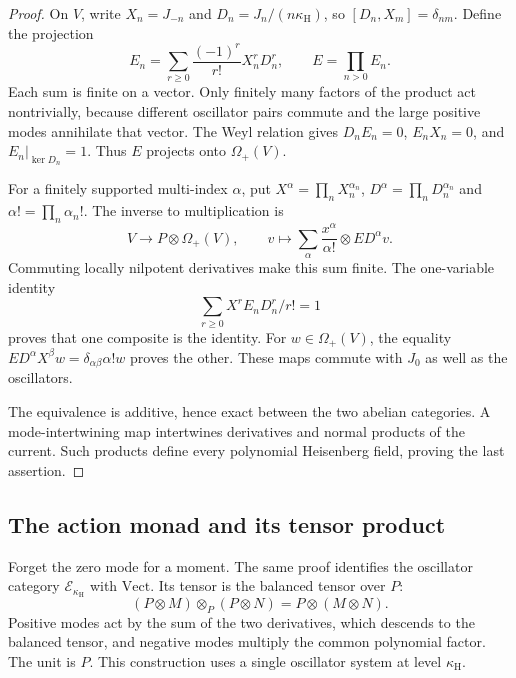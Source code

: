 \begin{proof}
On $V$, write $X_n=J_{-n}$ and
$D_n=J_n/(n\kappa_{\mathrm H})$, so
$[D_n,X_m]=\delta_{nm}$. Define the projection
\begin{equation}\label{cyrec:eq:projector}
 E_n=\sum_{r\geq0}\frac{(-1)^r}{r!}X_n^rD_n^r,
 \qquad E=\prod_{n>0}E_n.
\end{equation}
Each sum is finite on a vector. Only finitely many factors of the
product act nontrivially, because different oscillator pairs commute
and the large positive modes annihilate that vector.
The Weyl relation gives $D_nE_n=0$, $E_nX_n=0$, and
$E_n|_{\ker D_n}=1$. Thus $E$ projects onto $\Omega_+(V)$.

For a finitely supported multi-index $\alpha$, put
$X^\alpha=\prod_nX_n^{\alpha_n}$,
$D^\alpha=\prod_nD_n^{\alpha_n}$ and
$\alpha!=\prod_n\alpha_n!$. The inverse to multiplication is
\begin{equation}\label{cyrec:eq:taylor}
 V\longrightarrow P\otimes\Omega_+(V),
 \qquad
 v\longmapsto\sum_\alpha\frac{x^\alpha}{\alpha!}\otimes ED^\alpha v.
\end{equation}
Commuting locally nilpotent derivatives make this sum finite.
The one-variable identity
\[
 \sum_{r\geq0}X^rE_nD_n^r/r!=1
\]
proves that one composite is the identity. For $w\in\Omega_+(V)$, the equality
$ED^\alpha X^\beta w=\delta_{\alpha\beta}\alpha!w$ proves the other.
These maps commute with $J_0$ as well as the oscillators.

The equivalence is additive, hence exact between the two abelian
categories. A mode-intertwining map intertwines derivatives and
normal products of the current. Such products define every
polynomial Heisenberg field, proving the last assertion.
\end{proof}

\subsection{The action monad and its tensor product}

Forget the zero mode for a moment. The same proof identifies the
oscillator category $\mathcal E_{\kappa_{\mathrm H}}$ with
$\mathrm{Vect}$. Its tensor is the balanced tensor over $P$:
\[
 (P\otimes M)\otimes_P(P\otimes N)=P\otimes(M\otimes N).
\]
Positive modes act by the sum of the two derivatives, which descends
to the balanced tensor, and negative modes multiply the common
polynomial factor. The unit is $P$. This construction uses a single
oscillator system at level $\kappa_{\mathrm H}$.

